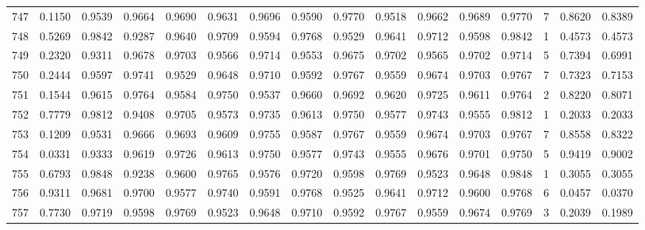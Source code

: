 \begin{tabular}{lrrrrrrrrrrrrrrr}
747 &      0.1150 &  0.9539 &  0.9664 &  0.9690 &  0.9631 &  0.9696 &  0.9590 &  0.9770 &  0.9518 &  0.9662 &   0.9689 &     0.9770 &      7 &                    0.8620 &                     0.8389 \\
748 &      0.5269 &  0.9842 &  0.9287 &  0.9640 &  0.9709 &  0.9594 &  0.9768 &  0.9529 &  0.9641 &  0.9712 &   0.9598 &     0.9842 &      1 &                    0.4573 &                     0.4573 \\
749 &      0.2320 &  0.9311 &  0.9678 &  0.9703 &  0.9566 &  0.9714 &  0.9553 &  0.9675 &  0.9702 &  0.9565 &   0.9702 &     0.9714 &      5 &                    0.7394 &                     0.6991 \\
750 &      0.2444 &  0.9597 &  0.9741 &  0.9529 &  0.9648 &  0.9710 &  0.9592 &  0.9767 &  0.9559 &  0.9674 &   0.9703 &     0.9767 &      7 &                    0.7323 &                     0.7153 \\
751 &      0.1544 &  0.9615 &  0.9764 &  0.9584 &  0.9750 &  0.9537 &  0.9660 &  0.9692 &  0.9620 &  0.9725 &   0.9611 &     0.9764 &      2 &                    0.8220 &                     0.8071 \\
752 &      0.7779 &  0.9812 &  0.9408 &  0.9705 &  0.9573 &  0.9735 &  0.9613 &  0.9750 &  0.9577 &  0.9743 &   0.9555 &     0.9812 &      1 &                    0.2033 &                     0.2033 \\
753 &      0.1209 &  0.9531 &  0.9666 &  0.9693 &  0.9609 &  0.9755 &  0.9587 &  0.9767 &  0.9559 &  0.9674 &   0.9703 &     0.9767 &      7 &                    0.8558 &                     0.8322 \\
754 &      0.0331 &  0.9333 &  0.9619 &  0.9726 &  0.9613 &  0.9750 &  0.9577 &  0.9743 &  0.9555 &  0.9676 &   0.9701 &     0.9750 &      5 &                    0.9419 &                     0.9002 \\
755 &      0.6793 &  0.9848 &  0.9238 &  0.9600 &  0.9765 &  0.9576 &  0.9720 &  0.9598 &  0.9769 &  0.9523 &   0.9648 &     0.9848 &      1 &                    0.3055 &                     0.3055 \\
756 &      0.9311 &  0.9681 &  0.9700 &  0.9577 &  0.9740 &  0.9591 &  0.9768 &  0.9525 &  0.9641 &  0.9712 &   0.9600 &     0.9768 &      6 &                    0.0457 &                     0.0370 \\
757 &      0.7730 &  0.9719 &  0.9598 &  0.9769 &  0.9523 &  0.9648 &  0.9710 &  0.9592 &  0.9767 &  0.9559 &   0.9674 &     0.9769 &      3 &                    0.2039 &                     0.1989 \\

\end{tabular}
